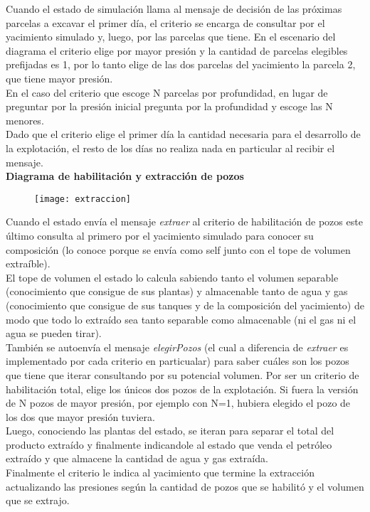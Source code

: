 Cuando el estado de simulación llama al mensaje de decisión de las próximas parcelas a excavar el primer día, el criterio se encarga de consultar por el yacimiento simulado y, luego, por las parcelas que tiene. En el escenario del diagrama el criterio elige por mayor presión y la cantidad de parcelas elegibles prefijadas es 1, por lo tanto elige de las dos parcelas del yacimiento la parcela 2, que tiene mayor presión.
\\

En el caso del criterio que escoge N parcelas por profundidad, en lugar de preguntar por la presión inicial pregunta por la profundidad y escoge las N menores.
\\

Dado que el criterio elige el primer día la cantidad necesaria para el desarrollo de la explotación, el resto de los días no realiza nada en particular al recibir el mensaje.
\\


\newpage
\textbf{Diagrama de habilitación y extracción de pozos}
\begin{figure}[H]
\texttt{[image: extraccion]}
\end{figure}

Cuando el estado envía el mensaje \emph{extraer} al criterio de habilitación de pozos este último consulta al primero por el yacimiento simulado para conocer su composición (lo conoce porque se envía como self junto con el tope de volumen extraíble).
\\

El tope de volumen el estado lo calcula sabiendo tanto el volumen separable (conocimiento que consigue de sus plantas) y almacenable tanto de agua y gas (conocimiento que consigue de sus tanques y de la composición del yacimiento) de modo que todo lo extraído sea tanto separable como almacenable (ni el gas ni el agua se pueden tirar).
\\

También se autoenvía el mensaje \emph{elegirPozos} (el cual a diferencia de \emph{extraer} es implementado por cada criterio en particualar) para saber cuáles son los pozos que tiene que iterar consultando por su potencial volumen. Por ser un criterio de habilitación total, elige los únicos dos pozos de la explotación. Si fuera la versión de N pozos de mayor presión, por ejemplo con N=1, hubiera elegido el pozo de los dos que mayor presión tuviera.
\\

Luego, conociendo las plantas del estado, se iteran para separar el total del producto extraído y finalmente indicandole al estado que venda el petróleo extraído y que almacene la cantidad de agua y gas extraída.
\\

Finalmente el criterio le indica al yacimiento que termine la extracción actualizando las presiones según la cantidad de pozos que se habilitó y el volumen que se extrajo.

